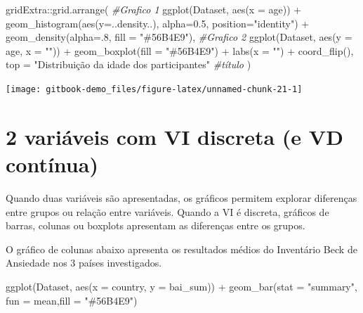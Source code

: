\documentclass[
]{book}
\newenvironment{Shaded}{\begin{snugshade}}{\end{snugshade}}
\newcommand{\AttributeTok}[1]{\textcolor[rgb]{0.77,0.63,0.00}{#1}}
\newcommand{\CommentTok}[1]{\textcolor[rgb]{0.56,0.35,0.01}{\textit{#1}}}
\newcommand{\DecValTok}[1]{\textcolor[rgb]{0.00,0.00,0.81}{#1}}
\newcommand{\FloatTok}[1]{\textcolor[rgb]{0.00,0.00,0.81}{#1}}
\newcommand{\FunctionTok}[1]{\textcolor[rgb]{0.00,0.00,0.00}{#1}}
\newcommand{\NormalTok}[1]{#1}
\newcommand{\SpecialCharTok}[1]{\textcolor[rgb]{0.00,0.00,0.00}{#1}}
\newcommand{\StringTok}[1]{\textcolor[rgb]{0.31,0.60,0.02}{#1}}
\begin{document}
\begin{Shaded}
\begin{Highlighting}[]
\NormalTok{gridExtra}\SpecialCharTok{::}\FunctionTok{grid.arrange}\NormalTok{(}
  \CommentTok{\#Grafico 1}
  \FunctionTok{ggplot}\NormalTok{(Dataset, }\FunctionTok{aes}\NormalTok{(}\AttributeTok{x =}\NormalTok{ age)) }\SpecialCharTok{+}
    \FunctionTok{geom\_histogram}\NormalTok{(}\FunctionTok{aes}\NormalTok{(}\AttributeTok{y=}\NormalTok{..density..), }\AttributeTok{alpha=}\FloatTok{0.5}\NormalTok{, }
                   \AttributeTok{position=}\StringTok{"identity"}\NormalTok{) }\SpecialCharTok{+} 
    \FunctionTok{geom\_density}\NormalTok{(}\AttributeTok{alpha=}\NormalTok{.}\DecValTok{8}\NormalTok{, }\AttributeTok{fill =} \StringTok{"\#56B4E9"}\NormalTok{),}
  \CommentTok{\#Grafico 2}
  \FunctionTok{ggplot}\NormalTok{(Dataset, }\FunctionTok{aes}\NormalTok{(}\AttributeTok{y =}\NormalTok{ age, }\AttributeTok{x =} \StringTok{""}\NormalTok{)) }\SpecialCharTok{+}
  \FunctionTok{geom\_boxplot}\NormalTok{(}\AttributeTok{fill =} \StringTok{"\#56B4E9"}\NormalTok{) }\SpecialCharTok{+} \FunctionTok{labs}\NormalTok{(}\AttributeTok{x =} \StringTok{""}\NormalTok{) }\SpecialCharTok{+}
  \FunctionTok{coord\_flip}\NormalTok{(),}
  \AttributeTok{top =} \StringTok{"Distribuição da idade dos participantes"} \CommentTok{\#título}
\NormalTok{)}
\end{Highlighting}
\end{Shaded}

\begin{center}\texttt{[image: gitbook-demo\_files/figure-latex/unnamed-chunk-21-1]} \end{center}

\hypertarget{variuxe1veis-com-vi-discreta-e-vd-contuxednua}{%
\section{2 variáveis com VI discreta (e VD contínua)}\label{variuxe1veis-com-vi-discreta-e-vd-contuxednua}}

Quando duas variáveis são apresentadas, os gráficos permitem explorar diferenças entre grupos ou relação entre variáveis. Quando a VI é discreta, gráficos de barras, colunas ou boxplots apresentam as diferenças entre os grupos.

O gráfico de colunas abaixo apresenta os resultados médios do Inventário Beck de Ansiedade nos 3 países investigados.

\begin{Shaded}
\begin{Highlighting}[]
\FunctionTok{ggplot}\NormalTok{(Dataset, }\FunctionTok{aes}\NormalTok{(}\AttributeTok{x =}\NormalTok{ country, }\AttributeTok{y =}\NormalTok{ bai\_sum)) }\SpecialCharTok{+}
  \FunctionTok{geom\_bar}\NormalTok{(}\AttributeTok{stat =} \StringTok{"summary"}\NormalTok{, }\AttributeTok{fun =}\NormalTok{ mean,}\AttributeTok{fill =} \StringTok{"\#56B4E9"}\NormalTok{) }
\end{Highlighting}
\end{Shaded}
\end{document}
